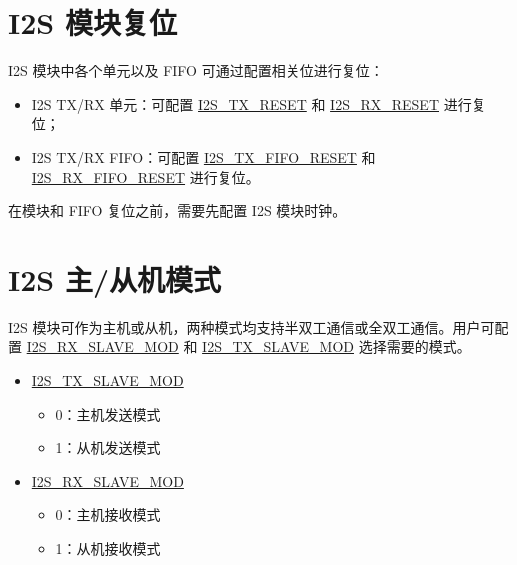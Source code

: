 \documentclass[main\_\_CN.tex]{subfiles}
\begin{document}
\section{I2S 模块复位} \label{sec:i2s-reset}

I2S 模块中各个单元以及 FIFO 可通过配置相关位进行复位：
\begin{itemize}
\item I2S TX/RX 单元：可配置 \hyperref[fielddesc:I2STXRESET]{I2S\_TX\_RESET} 和 \hyperref[fielddesc:I2SRXRESET]{I2S\_RX\_RESET} 进行复位；
\item I2S TX/RX FIFO：可配置 \hyperref[fielddesc:I2STXFIFORESET]{I2S\_TX\_FIFO\_RESET} 和 \hyperref[fielddesc:I2SRXFIFORESET]{I2S\_RX\_FIFO\_RESET} 进行复位。
\end{itemize}


\begin{tiplisting}
在模块和 FIFO 复位之前，需要先配置 I2S 模块时钟。
\end{tiplisting} 
 

\section{I2S 主/从机模式}

\chipname{} I2S 模块可作为主机或从机，两种模式均支持半双工通信或全双工通信。用户可配置  \hyperref[fielddesc:I2SRXSLAVEMOD]{I2S\_RX\_SLAVE\_MOD} 和 \hyperref[fielddesc:I2STXSLAVEMOD]{I2S\_TX\_SLAVE\_MOD} 选择需要的模式。

\begin{itemize}
    \item \hyperref[fielddesc:I2STXSLAVEMOD]{I2S\_TX\_SLAVE\_MOD} 
    \begin{itemize}
        \item 0：主机发送模式
        \item 1：从机发送模式
    \end{itemize}
    \item \hyperref[fielddesc:I2SRXSLAVEMOD]{I2S\_RX\_SLAVE\_MOD}
    \begin{itemize}
        \item 0：主机接收模式
        \item 1：从机接收模式
    \end{itemize}
\end{itemize}
\end{document}
